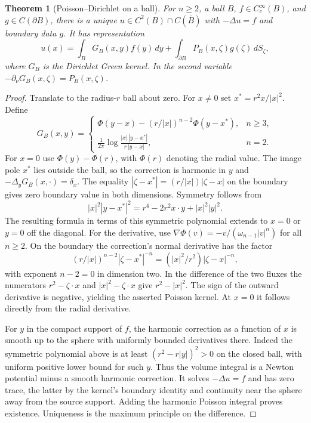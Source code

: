 \documentclass[11pt,oneside,openany]{book}
\theoremstyle{plain}
\newtheorem{theorem}{Theorem}[chapter]
\theoremstyle{definition}
\theoremstyle{remark}
\begin{document}
\begin{theorem}[Poisson--Dirichlet on a ball]
\label{thm:pde-poisson-dirichlet-ball}
For \(n\ge2\), a ball \(B\), \(f\in C_c^\infty(B)\), and
\(g\in C(\partial B)\), there is a unique
\(u\in C^2(B)\cap C(\overline B)\) with
\(-\Delta u=f\) and boundary data \(g\). It has representation
\[
 u(x)=\int_B G_B(x,y)f(y)\,dy+
                   \int_{\partial B}P_B(x,\zeta)g(\zeta)\,dS_\zeta ,
\]
where \(G_B\) is the Dirichlet Green kernel. In the second
variable \(-\partial_\nu G_B(x,\zeta)=P_B(x,\zeta)\).
\end{theorem}
\begin{proof}
Translate to the radius-\(r\) ball about zero. For \(x\ne0\) set
\(x^*=r^2x/|x|^2\). Define
\[
 G_B(x,y)=
 \begin{cases}
 \displaystyle\Phi(y-x)-(r/|x|)^{n-2}\Phi(y-x^*),
       & n\ge3,\\[1mm]
 \displaystyle\frac{1}{2\pi}
       \log\frac{|x|\,|y-x^*|}{r\,|y-x|},& n=2 .
 \end{cases}
\]
For \(x=0\) use \(\Phi(y)-\Phi(r)\), with \(\Phi(r)\)
denoting the radial value. The image pole \(x^*\) lies
outside the ball, so the correction is harmonic in \(y\)
and \(-\Delta_yG_B(x,\cdot)=\delta_x\).
The equality
\(|\zeta-x^*|=(r/|x|)|\zeta-x|\) on the boundary gives
zero boundary value in both dimensions. Symmetry follows from
\[
 |x|^2|y-x^*|^2
    =r^4-2r^2 x\cdot y+|x|^2|y|^2 .
\]
The resulting formula in terms of this symmetric polynomial
extends to \(x=0\) or \(y=0\) off the diagonal.
For the derivative, use
\(\nabla\Phi(v)=-v/(\omega_{n-1}|v|^n)\)
for all \(n\ge2\). On the boundary the correction's
normal derivative has the factor
\[
 (r/|x|)^{n-2}|\zeta-x^*|^{-n}
      =(|x|^2/r^2)|\zeta-x|^{-n},
\]
with exponent \(n-2=0\) in dimension two. In the
difference of the two fluxes the numerators
\(r^2-\zeta\cdot x\) and \(|x|^2-\zeta\cdot x\)
give \(r^2-|x|^2\). The sign of the outward derivative
is negative, yielding the asserted Poisson kernel.
At \(x=0\) it follows directly from the radial derivative.

For \(y\) in the compact support of \(f\), the harmonic
correction as a function of \(x\) is smooth up to the
sphere with uniformly bounded derivatives there. Indeed
the symmetric polynomial above is at least
\((r^2-r|y|)^2>0\) on the closed ball, with uniform positive
lower bound for such \(y\). Thus the volume integral
is a Newton potential minus a smooth harmonic correction.
It solves \(-\Delta u=f\) and has zero trace, the latter
by the kernel's boundary identity and continuity near the
sphere away from the source support. Adding the harmonic
Poisson integral proves existence. Uniqueness is the
maximum principle on the difference.
\end{proof}
\end{document}

